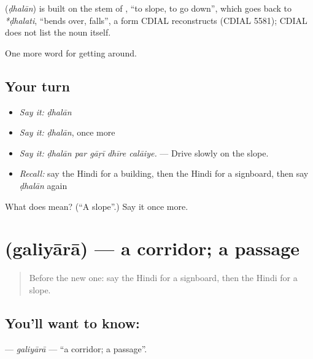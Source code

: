 \begin{cousinweb}
\textbf{} (\emph{ḍhalān}) is built on the stem of , \textquotedblleft{}to slope, to go down\textquotedblright{}, which goes back to \emph{*ḍhalati}, \textquotedblleft{}bends over, falls\textquotedblright{}, a form CDIAL reconstructs (CDIAL 5581); CDIAL does not list the noun itself.
\end{cousinweb}

\begin{grammarlens}[title={What you've built}]
One more word for getting around.
\end{grammarlens}

\subsection*{Your turn}
\begin{itemize}
\raggedright
  \item \emph{Say it:} \emph{ḍhalān}
  \item \emph{Say it:} \emph{ḍhalān}, once more
  \item \emph{Say it:} \emph{ḍhalān par gāṛī dhīre calāiye.} — Drive slowly on the slope.
  \item \emph{Recall:} say the Hindi for a building, then the Hindi for a signboard, then say \emph{ḍhalān} again
\end{itemize}

\begin{tcolorbox}[breakable,colback=teal!4,colframe=teal!35!black,title={Before you move on}]
What does  mean? (\textquotedblleft{}A slope\textquotedblright{}.) Say it once more.
\end{tcolorbox}
\section[\texorpdfstring{\hi{गलियारा} (galiyārā)}{गलियारा (galiyārā)}]{ (galiyārā) — a corridor; a passage}

\label{lesson:HI-C420-galiyara}



\begin{quote}
Before the new one: say the Hindi for a signboard, then the Hindi for a slope.
\end{quote}

\subsection*{You'll want to know: }
\textbf{} — \emph{galiyārā} — \textquotedblleft{}a corridor; a passage\textquotedblright{}.

